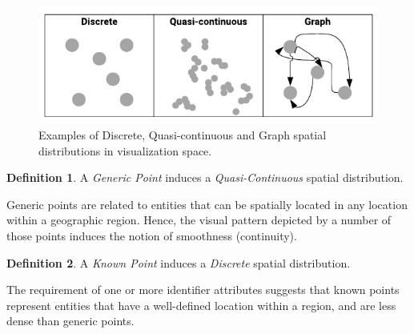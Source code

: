 \documentclass[]{interact}
\theoremstyle{plain}%
\theoremstyle{definition}
\theoremstyle{remark}
\theoremstyle{definition}
\newtheorem{defn}{Definition}[section]
\begin{document}
\begin{figure}[htbp]
\centering
\includegraphics[width=0.8\linewidth]{images/spatialdistribution.pdf}
\caption{Examples of Discrete, Quasi-continuous and Graph spatial distributions in visualization space.}
\label{fig:spatialdistribution}
\end{figure}

\begin{defn}\label{dfn:genericpoint_distribution}
A \emph{Generic Point} induces a \emph{Quasi-Continuous} spatial distribution.
\end{defn}

Generic points are related to entities that can be spatially located in any location within a geographic region. Hence, the visual pattern depicted by a number of those points induces the notion of smoothness (continuity).

%

\begin{defn}\label{dfn:knownpoint_distribution}
A \emph{Known Point} induces a \emph{Discrete} spatial distribution.
\end{defn}

The requirement of one or more identifier attributes suggests that known points represent entities that have a well-defined location within a region, and are less dense than generic points.

%
\end{document}
